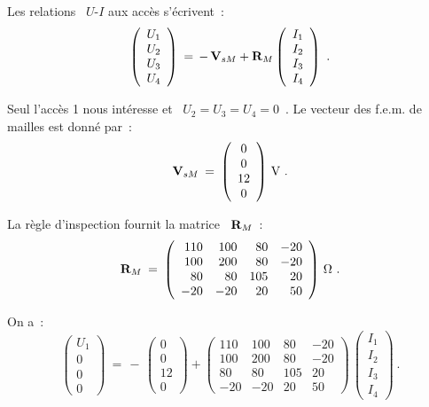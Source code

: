 Les relations \ $U$-$I$ aux accès s'écrivent~:
\[ \left( \begin{array}{c} U_1 \\ U_2 \\ U_3 \\ U_4 \end{array} \right)
\: = \, -\, {\bf V}_{sM} + {\bf R}_M
\left(  \begin{array}{c} I_1 \\ I_2 \\ I_3 \\ I_4 \end{array} \right)~. \]

Seul l'accès 1 nous intéresse et \ $U_2 = U_3 = U_4 = 0$~. Le vecteur
des f.e.m. de mailles est donné par~:
\[ {\bf V}_{sM} \: = \: \left(  \begin{array}{c} 0 \\ 0 \\ 12 \\ 0 \end{array} \right)\, \text{V~.} \]

La règle d'inspection fournit la matrice \ ${\bf R}_M$~:
\[ {\bf R}_M \: = \: 
\left( \begin{array}{rrrr}
110 & 100 & 80 & -20\\
100 & 200 & 80 & -20\\
80 & 80 & 105 & 20\\
-20 & -20 & 20 & 50 
\end{array} \right)\, \Omega \text{~.} \]

On a~:
\[ \left( \begin{array}{c} U_1 \\\hline
0 \\ 0 \\ 0 \end{array} \right)
\: = \, -\, 
\left( \begin{array}{c} 0 \\\hline
0 \\ 12 \\ 0 \end{array} \right)
+ \left( \begin{array}{r|rrr} 
110 & 100 & 80 & -20 \\\hline
100 & 200 & 80 & -20\\
80 & 80 & 105 & 20\\
-20 & -20 & 20 & 50
\end{array} \right) \, 
\left(  \begin{array}{c} I_1 \\ I_2 \\ I_3 \\ I_4 \end{array} \right)~.  \]

